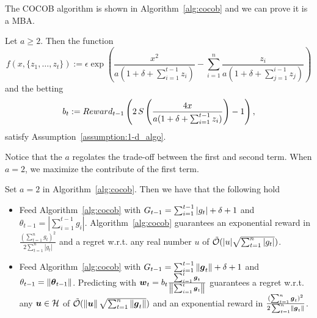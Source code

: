 The \ac{COCOB} algorithm is shown in Algorithm~\ref{alg:cocob} and we can prove it is a \ac{MBA}.
%
\begin{theorem}
\label{theo:cocob}
Let $a\geq2$. Then the function 
\[
f(x,\{z_1, \ldots, z_t\}) := \epsilon \exp\left(\frac{x^2}{a (1+\delta+\sum_{i=1}^{t-1} z_i)} - \sum_{i=1}^{n} \frac{z_i}{a( 1+\delta+\sum_{j=1}^{i-1} z_j) } \right)
\]
and the betting 
\[
b_t:= Reward_{t-1} \left(2 \, S\left(\frac{4 x}{a (1+\delta+\sum_{i=1}^{t-1} z_i)}\right)-1\right),
\]
satisfy Assumption~\ref{assumption:1-d_algo}.
% 
\end{theorem}
%
Notice that the $a$ regolates the trade-off between the first and second term. When $a=2$, we maximize the contribute of the first term.

\begin{cor}
Set $a=2$ in Algorithm~\ref{alg:cocob}. Then we have that the following hold

\begin{itemize}
\item Feed Algorithm~\ref{alg:cocob} with $G_{t-1}=\sum_{i=1}^{t-1} |g_t| + \delta + 1$ and $\theta_{t-1}=|\sum_{i=1}^{t-1} g_i|$.
Algorithm~\ref{alg:cocob} guarantees an exponential reward in $\frac{(\sum_{t=1}^n g_t)^2}{2 \sum_{t=1}^n |g_t|}$ and a regret w.r.t. any real number $u$ of $\tilde{\mathcal{O}}(|u| \sqrt{\sum_{t=1}^n |g_t|})$.

\item Feed Algorithm~\ref{alg:cocob} with $G_{t-1}=\sum_{i=1}^{t-1} \left\|{\boldsymbol{g}_t}\right\| + \delta + 1$ and $\theta_{t-1}=\left\|{{\boldsymbol{\theta}}_{t-1}}\right\|$.
Predicting with $\boldsymbol{w}_t=b_t \frac{\sum_{i=1}^t \boldsymbol{g}_t}{\left\|{\sum_{i=1}^t \boldsymbol{g}_t}\right\|}$ guarantees a regret w.r.t. any $\boldsymbol{u} \in \mathcal{H}$ of $\tilde{\mathcal{O}}(\left\|{\boldsymbol{u}}\right\| \sqrt{\sum_{t=1}^n \left\|{\boldsymbol{g}_t}\right\|})$ and an exponential reward in $\frac{(\sum_{t=1}^n \boldsymbol{g}_t)^2}{2 \sum_{t=1}^n \left\|{\boldsymbol{g}_t}\right\|}$.

\end{itemize}
\end{cor}